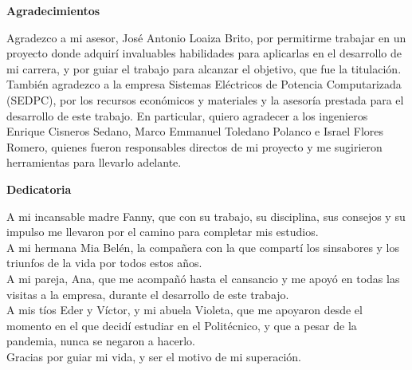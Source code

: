 \newpage
\thispagestyle{empty}
\textbf{\Huge Agradecimientos}
\vspace{1cm}

Agradezco a mi asesor, José Antonio Loaiza Brito, por permitirme trabajar en un proyecto donde adquirí invaluables habilidades para aplicarlas en el desarrollo de mi carrera, y por guiar el trabajo para alcanzar el objetivo, que fue la titulación.\\
También agradezco a la empresa Sistemas Eléctricos de Potencia Computarizada (SEDPC), por los recursos económicos y materiales y la asesoría prestada para el desarrollo de este trabajo. En particular, quiero agradecer a los ingenieros Enrique Cisneros Sedano, Marco Emmanuel Toledano Polanco e Israel Flores Romero, quienes fueron responsables directos de mi proyecto y me sugirieron herramientas para llevarlo adelante.

\newpage
\thispagestyle{empty}
\textbf{\Huge Dedicatoria}
\vspace{1cm}

A mi incansable madre Fanny, que con su trabajo, su disciplina, sus consejos y su impulso me llevaron por el camino para completar mis estudios.\\
A mi hermana Mia Belén, la compañera con la que compartí los sinsabores y los triunfos de la vida por todos estos años.\\
A mi pareja, Ana, que me acompañó hasta el cansancio y me apoyó en todas las visitas a la empresa, durante el desarrollo de este trabajo.\\
A mis tíos Eder y Víctor, y mi abuela Violeta, que me apoyaron desde el momento en el que decidí estudiar en el Politécnico, y que a pesar de la pandemia, nunca se negaron a hacerlo.\\
Gracias por guiar mi vida, y ser el motivo de mi superación.